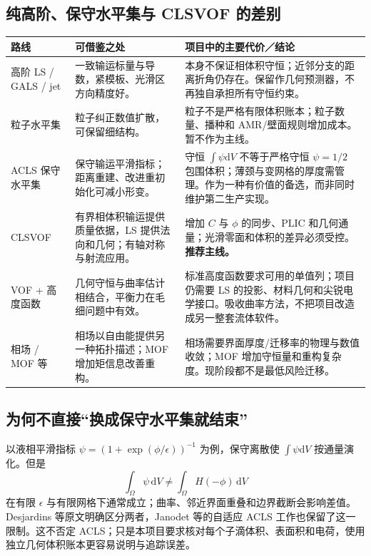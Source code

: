 \documentclass[11pt,a4paper]{article}
\newcommand{\dd}{\mathrm{d}}
\begin{document}
\subsection{纯高阶、保守水平集与 CLSVOF 的差别}
\begin{longtable}{L{29mm}L{51mm}L{65mm}}
\toprule 路线 & 可借鉴之处 & 项目中的主要代价／结论\\\midrule\endhead
高阶 LS / GALS / jet & 一致输运标量与导数，紧模板、光滑区方向精度好\cite{nave2010}。 & 本身不保证相体积守恒；近邻分支的距离折角仍存在。保留作几何预测器，不再独自承担所有守恒约束。\\
粒子水平集 & 粒子纠正数值扩散，可保留细结构\cite{enright2002}。 & 粒子不是严格有限体积账本；粒子数量、播种和 AMR/壁面规则增加成本。暂不作为主线。\\
ACLS 保守水平集 & 保守输运平滑指标；距离重建、改进重初始化可减小形变\cite{olsson2005,desjardins2008,chiodi2017}。 & 守恒 $\int\psi\dd V$ 不等于严格守恒 $\psi=1/2$ 包围体积；薄颈与变网格的厚度需管理。作为一种有价值的备选，而非同时维护第二生产实现。\\
CLSVOF & 有界相体积输运提供质量依据，LS 提供法向和几何；有轴对称与射流应用\cite{sussman2000,menard2007}。 & 增加 $C$ 与 $\phi$ 的同步、PLIC 和几何通量；光滑零面和体积的差异必须受控。\textbf{推荐主线。}\\
VOF + 高度函数 & 几何守恒与曲率估计相结合，平衡力在毛细问题中有效\cite{cummins2005,popinet2009}。 & 标准高度函数要求可用的单值列；项目仍需要 LS 的投影、材料几何和尖锐电学接口。吸收曲率方法，不把项目改造成另一整套流体软件。\\
相场 / MOF 等 & 相场以自由能提供另一种拓扑描述；MOF 增加矩信息改善重构。 & 相场需要界面厚度/迁移率的物理与数值收敛；MOF 增加守恒量和重构复杂度。现阶段都不是最低风险迁移。\\\bottomrule
\end{longtable}

\subsection{为何不直接“换成保守水平集就结束”}
以液相平滑指标 $\psi=(1+\exp(\phi/\epsilon))^{-1}$ 为例，保守离散使 $\int\psi\dd V$ 按通量演化。但是
\begin{equation}
 \int_\Omega\psi\,\dd V\ne\int_\Omega H(-\phi)\,\dd V
\end{equation}
在有限 $\epsilon$ 与有限网格下通常成立；曲率、邻近界面重叠和边界截断会影响差值。Desjardins 等原文明确区分两者，Janodet 等的自适应 ACLS 工作也保留了这一限制\cite{desjardins2008,janodet2022}。这不否定 ACLS；只是本项目要求核对每个子滴体积、表面积和电荷，使用独立几何体积账本更容易说明与追踪误差。
\end{document}
